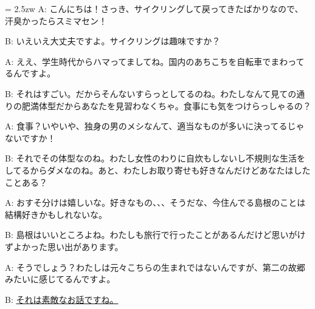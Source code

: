 \documentclass[11pt]{amsart}
\title{}
\author{}
\newenvironment{hangall}[1]{\hangindent = 2.5zw\everypar{\hangindent = 2.5zw}}{}
\begin{document}
\maketitle
\begin{hangall}{}%
A: こんにちは！さっき、サイクリングして戻ってきたばかりなので、汗臭かったらスミマセン！

B: いえいえ大丈夫ですよ。サイクリングは趣味ですか？

A: ええ、学生時代からハマってましてね。国内のあちこちを自転車でまわってるんですよ。

B: それはすごい。だからそんないすらっとしてるのね。わたしなんて見ての通りの肥満体型だからあなたを見習わなくちゃ。食事にも気をつけらっしゃるの？

A: 食事？いやいや、独身の男のメシなんて、適当なものが多いに決ってるじゃないですか！

B: それでその体型なのね。わたし女性のわりに自炊もしないし不規則な生活をしてるからダメなのね。あと、わたしお取り寄せも好きなんだけどあなたはしたことある？

A: おすそ分けは嬉しいな。好きなもの、、、そうだな、今住んでる島根のことは結構好きかもしれないな。

B: 島根はいいところよね。わたしも旅行で行ったことがあるんだけど思いがけずよかった思い出があります。

A: そうでしょう？わたしは元々こちらの生まれではないんですが、第二の故郷みたいに感じてるんですよ。

B: \ul{それは素敵なお話ですね。}\end{hangall}
\end{document}
